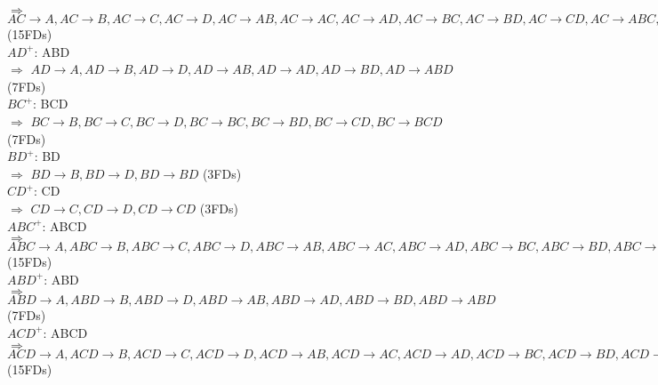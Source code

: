 \documentclass[]{article}
\begin{document}
	$\Longrightarrow$ $AC\rightarrow A, AC\rightarrow B, AC\rightarrow C, AC\rightarrow D, AC\rightarrow AB, AC\rightarrow AC, AC\rightarrow AD, AC\rightarrow BC, AC\rightarrow BD, AC\rightarrow CD, AC\rightarrow ABC, AC\rightarrow ABD, AC\rightarrow ACD, AC\rightarrow BCD, AC\rightarrow ABCD$ (15FDs)  \\
	
	$AD^{+}$: ABD  \\
	
	$\Longrightarrow$ $AD\rightarrow A, AD\rightarrow B, AD\rightarrow D, AD\rightarrow AB, AD\rightarrow AD, AD\rightarrow BD, AD\rightarrow ABD$ (7FDs)  \\
	
	$BC^{+}$: BCD  \\
	
	$\Longrightarrow$ $BC\rightarrow B, BC\rightarrow C, BC\rightarrow D, BC\rightarrow BC, BC\rightarrow BD, BC\rightarrow CD, BC\rightarrow BCD$ (7FDs)  \\
	
	$BD^{+}$: BD  \\
	
	$\Longrightarrow$ $BD\rightarrow B, BD\rightarrow D, BD\rightarrow BD$ (3FDs)  \\
	
	$CD^{+}$: CD  \\
	
	$\Longrightarrow$ $CD\rightarrow C, CD\rightarrow D, CD\rightarrow CD$ (3FDs)  \\
	
	$ABC^{+}$: ABCD  \\
	
	$\Longrightarrow$ $ABC\rightarrow A, ABC\rightarrow B, ABC\rightarrow C, ABC\rightarrow D, ABC\rightarrow AB, ABC\rightarrow AC, ABC\rightarrow AD, ABC\rightarrow BC, ABC\rightarrow BD, ABC\rightarrow CD, ABC\rightarrow ABC, ABC\rightarrow ABD, ABC\rightarrow ACD, ABC\rightarrow BCD, ABC\rightarrow ABCD$ (15FDs)  \\
	
	$ABD^{+}$: ABD  \\
	
	$\Longrightarrow$ $ABD\rightarrow A, ABD\rightarrow B, ABD\rightarrow D, ABD\rightarrow AB, ABD\rightarrow AD, ABD\rightarrow BD, ABD\rightarrow ABD$ (7FDs)  \\
	
	$ACD^{+}$: ABCD  \\
	
	$\Longrightarrow$ $ACD\rightarrow A, ACD\rightarrow B, ACD\rightarrow C, ACD\rightarrow D, ACD\rightarrow AB, ACD\rightarrow AC, ACD\rightarrow AD, ACD\rightarrow BC, ACD\rightarrow BD, ACD\rightarrow CD, ACD\rightarrow ABC, ACD\rightarrow ABD, ACD\rightarrow ACD, ACD\rightarrow BCD, ACD\rightarrow ABCD$ (15FDs)  \\
	
\end{document}
